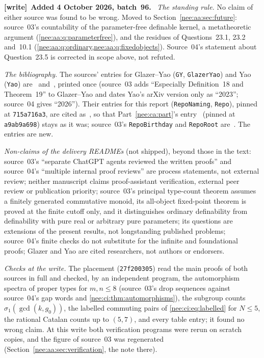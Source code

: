 \documentclass[11pt,letterpaper]{article}
\numberwithin{equation}{section}
\theoremstyle{plain}
\theoremstyle{definition}
\theoremstyle{remark}
\newenvironment{writenote}[1][]{\par\smallskip\begingroup\small\raggedright
 \setlength{\parindent}{1.25em}\noindent\textbf{[write]}\if\relax\detokenize{#1}\relax\else~\textbf{#1.}\fi\ }%
 {\par\endgroup\smallskip}
\begin{document}
\begin{writenote}[Added 4 October 2026, batch~96]
\emph{The standing rule.} No claim of either source was found to be wrong. Moved to Section~\ref{nee:aa:sec:future}: source~03's countability of the parameter-free definable kernel, a metatheoretic argument (\cref{nee:aa:q:parameterfree}), and the residues of Questions~23.1, 23.2 and~10.1 (\cref{nee:aa:q:ordinary,nee:aa:q:fixedobjects}). Source~04's statement about Question~23.5 is corrected in scope above, not refuted.

\emph{The bibliography.} The sources' entries for Glazer--Yao (\texttt{GY}, \texttt{GlazerYao}) and Yao (\texttt{Yao}) are~\cite{GY2026} and~\cite{Yao2023}, printed once (source~03 adds ``Especially Definition~18 and Theorem~19'' to Glazer--Yao and dates Yao's arXiv version only as ``2023''; source~04 gives ``2026''). Their entries for this report (\texttt{RepoNaming}, \texttt{Repo}), pinned at \texttt{715a716a3}, are cited as~\cite{RepoNamingIII}, so that Part~\ref{nee:ca:part}'s entry~\cite{RepoNaming} (pinned at \texttt{a9ab9a698}) stays as it was; source~03's \texttt{RepoBirthday} and \texttt{RepoRoot} are~\cite{RepoBirthday,RepoRoot}. The entries \cite{GlazerThesis,BaileyRenshaw,Boardman,Koch,Anderson,ChanLevine,GorskyMazin,Johnson} are new.

\emph{Non-claims of the delivery READMEs} (not shipped), beyond those in the text: source~03's ``separate ChatGPT agents reviewed the written proofs'' and source~04's ``multiple internal proof reviews'' are process statements, not external review; neither manuscript claims proof-assistant verification, external peer review or publication priority; source~03's principal type-count theorem assumes a finitely generated commutative monoid, its all-object fixed-point theorem is proved at the finite cutoff only, and it distinguishes ordinary definability from definability with pure real or arbitrary pure parameters; its questions are extensions of the present results, not longstanding published problems; source~04's finite checks do not substitute for the infinite and foundational proofs; Glazer and Yao are cited researchers, not authors or endorsers.

\emph{Checks at the write.} The placement (\texttt{27f200305}) read the main proofs of both sources in full and checked, by an independent program, the automorphism spectra of proper types for $m,n\leq8$ (source~03's drop sequences against source~04's gap words and \cref{nee:ci:thm:automorphisms}), the subgroup counts $\sigma_1(\gcd(k,g_0))$, the labelled commuting pairs of \eqref{nee:ci:eq:labelled} for $N\leq5$, the rational Catalan counts up to $(5,7)$, and every table entry; it found no wrong claim. At this write both verification programs were rerun on scratch copies, and the figure of source~03 was regenerated (Section~\ref{nee:aa:sec:verification}, the note there).
\end{writenote}
\end{document}
